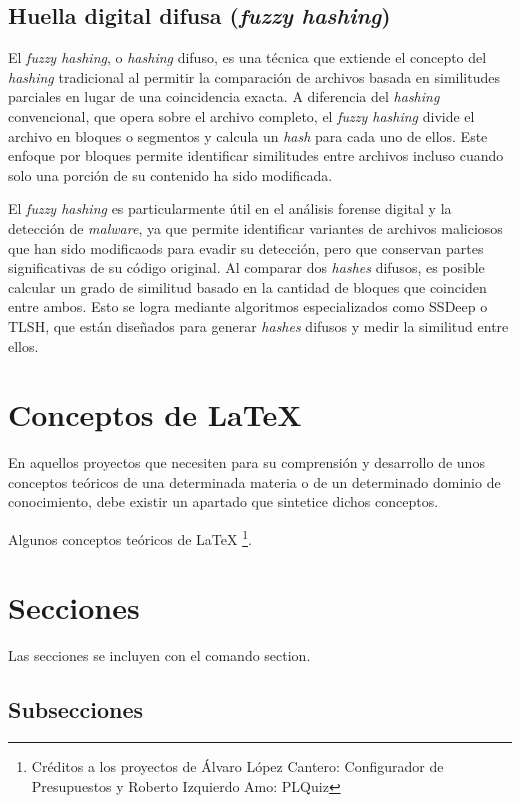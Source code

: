 \subsection{Huella digital difusa (\textit{fuzzy hashing})}
El \textit{fuzzy hashing}, o \textit{hashing} difuso, es una técnica que extiende el concepto del \textit{hashing} tradicional al permitir la comparación de archivos basada en similitudes parciales en lugar de una coincidencia exacta. A diferencia del \textit{hashing} convencional, que opera sobre el archivo completo, el \textit{fuzzy hashing} divide el archivo en bloques o segmentos y calcula un \textit{hash} para cada uno de ellos. Este enfoque por bloques permite identificar similitudes entre archivos incluso cuando solo una porción de su contenido ha sido modificada.

El \textit{fuzzy hashing} es particularmente útil en el análisis forense digital y la detección de \textit{malware}, ya que permite identificar variantes de archivos maliciosos que han sido modificaods para evadir su detección, pero que conservan partes significativas de su código original. Al comparar dos \textit{hashes} difusos, es posible calcular un grado de similitud basado en la cantidad de bloques que coinciden entre ambos. Esto se logra mediante algoritmos especializados como SSDeep o TLSH, que están diseñados para generar \textit{hashes} difusos y medir la similitud entre ellos.

\section{Conceptos de LaTeX}
En aquellos proyectos que necesiten para su comprensión y desarrollo de unos conceptos teóricos de una determinada materia o de un determinado dominio de conocimiento, debe existir un apartado que sintetice dichos conceptos.

Algunos conceptos teóricos de \LaTeX{} \footnote{Créditos a los proyectos de Álvaro López Cantero: Configurador de Presupuestos y Roberto Izquierdo Amo: PLQuiz}.

\section{Secciones}

Las secciones se incluyen con el comando section.

\subsection{Subsecciones}

